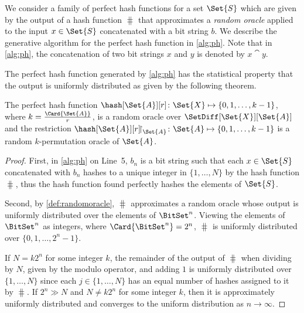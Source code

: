 \documentclass[ ../main.tex]{subfiles}
\begin{document}
We consider a family of perfect hash functions for a set $\Set{S}$ which are given by the output of a hash function $\hash$ that approximates a \emph{random oracle} applied to the input $x \in \Set{S}$ concatenated with a bit string $b$. We describe the generative algorithm for the perfect hash function in \cref{alg:ph}. Note that in \cref{alg:ph}, the concatenation of two bit strings $x$ and $y$ is denoted by $x \cat y$.

The perfect hash function generated by \cref{alg:ph} has the statistical property that the output is uniformly distributed as given by the following theorem.
\begin{theorem}
The perfect hash function $\hash[\Set{A}][r] \colon \Set{X} \mapsto \{0,1,\ldots,k-1\}$, where $k = \frac{\Card{\Set{A}}}{r}$, is a random oracle over $\SetDiff[\Set{X}][\Set{A}]$ and the restriction $\hash[\Set{A}][r] \!\restriction_{\Set{A}} \colon \Set{A} \mapsto \{0,1,\ldots,k-1\}$ is a random $k$-permutation oracle of $\Set{A}$.
\end{theorem}
\begin{proof}
First, in \cref{alg:ph} on Line~5, $b_n$ is a bit string such that each $x \in \Set{S}$ concatenated with $b_n$ hashes to a unique integer in $\{1,\ldots,N\}$ by the hash function $\hash$, thus the hash function found perfectly hashes the elements of $\Set{S}$. 

Second, by \cref{def:randomoracle}, $\hash$ approximates a random oracle whose output is uniformly distributed over the elements of $\BitSet^{n}$. Viewing the elements of $\BitSet^{n}$ as integers, where $\Card{\BitSet^{n}} = 2^n$, $\hash$ is uniformly distributed over $\{0,1,\ldots,2^n-1\}$.

If $N = k 2^n$ for some integer $k$, the remainder of the output of $\hash$ when dividing by $N$, given by the modulo operator, and adding $1$ is uniformly distributed over $\{1,\ldots,N\}$ since each $j \in \{1,\ldots,N\}$ has an equal number of hashes assigned to it by $\hash$. If $2^n \gg N$ and $N \neq k 2^n$ for some integer $k$, then it is approximately uniformly distributed and converges to the uniform distribution as $n \to \infty$.
\end{proof}
\end{document}
